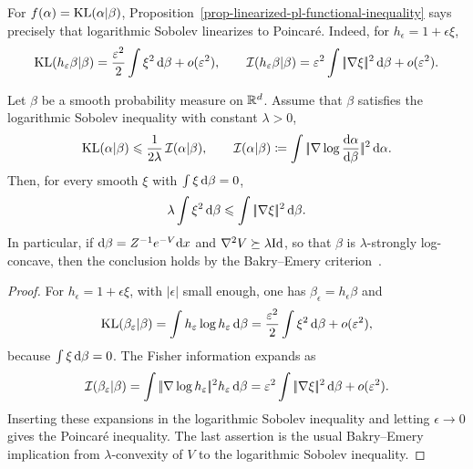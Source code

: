 For \(f(\alpha)=\operatorname{KL}(\alpha|\beta)\), Proposition~\ref{prop-linearized-pl-functional-inequality} says precisely that logarithmic Sobolev linearizes to Poincar\'e. Indeed, for \(h_\epsilon=1+\epsilon\xi\),
\[
	\operatorname{KL}(h_\varepsilon\beta|\beta)
	=
	\frac{\varepsilon^2}{2}\int\xi^2\,\mathrm{d}\beta+o(\varepsilon^2),
	\qquad
	\mathcal I(h_\varepsilon\beta|\beta)
	=
	\varepsilon^2\int|\!| \nabla\xi |\!|^2\,\mathrm{d}\beta+o(\varepsilon^2).
\]

\begin{prop}\label{prop-poincare-linearized-wasserstein-pl}
	Let \(\beta\) be a smooth probability measure on \(\mathbb{R}^d\). Assume that \(\beta\) satisfies the logarithmic Sobolev inequality with constant \(\lambda>0\),
	\[
		\operatorname{KL}(\alpha|\beta)
		\leqslant
		\frac{1}{2\lambda}\,\mathcal I(\alpha|\beta),
		\qquad
		\mathcal I(\alpha|\beta)
		\coloneqq
		\int|\!| \nabla\log\frac{\mathrm{d}\alpha}{\mathrm{d}\beta} |\!|^2\,\mathrm{d}\alpha.
	\]
	Then, for every smooth \(\xi\) with \(\int\xi\,\mathrm{d}\beta=0\),
	\[
		\lambda\int\xi^2\,\mathrm{d}\beta
		\leqslant
		\int|\!| \nabla\xi |\!|^2\,\mathrm{d}\beta.
	\]
	In particular, if \(\mathrm{d}\beta=Z^{-1}e^{-V}\mathrm{d} x\) and \(\nabla^2 V\succeq \lambda\mathrm{Id}\), so that \(\beta\) is \(\lambda\)-strongly log-concave, then the conclusion holds by the Bakry--Emery criterion~\cite{BakryEmery1985Diffusions,BakryGentilLedoux2014Markov}.
\end{prop}

\begin{proof}
	For \(h_\epsilon=1+\epsilon\xi\), with \(|\epsilon|\) small enough, one has \(\beta_\epsilon=h_\epsilon\beta\) and
	\[
		\operatorname{KL}(\beta_\varepsilon|\beta)
		=
		\int h_\varepsilon\log h_\varepsilon\,\mathrm{d}\beta
		=
		\frac{\varepsilon^2}{2}\int\xi^2\,\mathrm{d}\beta+o(\varepsilon^2),
	\]
	because \(\int\xi\,\mathrm{d}\beta=0\). The Fisher information expands as
	\[
		\mathcal I(\beta_\varepsilon|\beta)
		=
		\int|\!| \nabla\log h_\varepsilon |\!|^2 h_\varepsilon\,\mathrm{d}\beta
		=
		\varepsilon^2\int|\!| \nabla\xi |\!|^2\,\mathrm{d}\beta+o(\varepsilon^2).
	\]
		Inserting these expansions in the logarithmic Sobolev inequality and letting \(\epsilon\to0\) gives the Poincar\'e inequality. The last assertion is the usual Bakry--Emery implication from \(\lambda\)-convexity of \(V\) to the logarithmic Sobolev inequality.
\end{proof}

